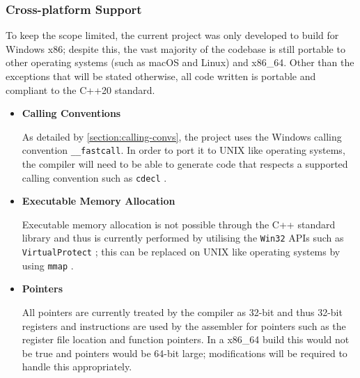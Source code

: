 \subsubsection{Cross-platform Support}

To keep the scope limited, the current project was only developed to build for Windows x86; despite this, the vast majority of the codebase is still portable to other operating systems (such as macOS and Linux) and x86\_64. Other than the exceptions that will be stated otherwise, all code written is portable and compliant to the C++20 standard.

\begin{itemize}
    \item \textbf{Calling Conventions}
    
    As detailed by \autoref{section:calling-convs}, the project uses the Windows calling convention \texttt{\_\_fastcall}. In order to port it to UNIX like operating systems, the compiler will need to be able to generate code that respects a supported calling convention such as \texttt{cdecl} \cite{cpp-calling-convs}.

    \item \textbf{Executable Memory Allocation}
    
    Executable memory allocation is not possible through the C++ standard library and thus is currently performed by utilising the \texttt{Win32} APIs such as \texttt{VirtualProtect} \cite{win32-VirtualProtect}; this can be replaced on UNIX like operating systems by using \texttt{mmap} \cite{cpp-mmap}.

    \item \textbf{Pointers}
    
    All pointers are currently treated by the compiler as 32-bit and thus 32-bit registers and instructions are used by the assembler for pointers such as the register file location and function pointers. In a x86\_64 build this would not be true and pointers would be 64-bit large; modifications will be required to handle this appropriately.
\end{itemize}